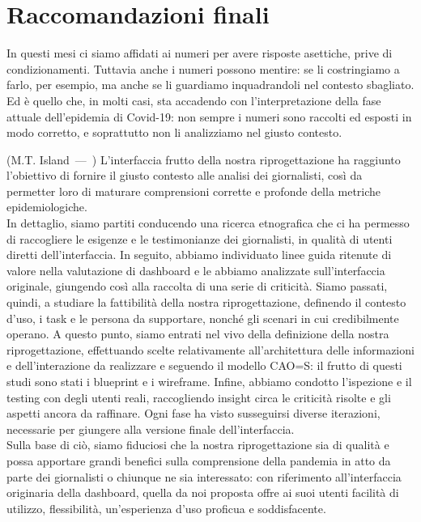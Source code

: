 \documentclass[../../main]{subfiles}
\begin{document}
\chapter{Raccomandazioni finali}
\label{c:raccomandazioni-finali}

\let\oldquote\quote
\let\endoldquote\endquote
\renewenvironment{quote}[2][]
{\if\relax\detokenize{#1}\relax
        \def\quoteauthor{#2}%
    \else
        \def\quoteauthor{#2~---~#1}%
    \fi
    \oldquote}
{\par\nobreak\smallskip\hfill(\quoteauthor)%
    \endoldquote\addvspace{\bigskipamount}}

\begin{quote}{M.T. Island}
    In questi mesi ci siamo affidati ai numeri per avere risposte asettiche, prive di condizionamenti.
    Tuttavia anche i numeri possono mentire: se li costringiamo a farlo, per esempio, ma anche se li guardiamo inquadrandoli nel contesto sbagliato.
    Ed è quello che, in molti casi, sta accadendo con l'interpretazione della fase attuale dell'epidemia di Covid-19: non sempre i numeri sono raccolti ed esposti in modo corretto, e soprattutto non li analizziamo nel giusto contesto.
\end{quote}
\noindent
L'interfaccia frutto della nostra riprogettazione ha raggiunto l'obiettivo di fornire il giusto contesto alle analisi dei giornalisti, così da permetter loro di maturare comprensioni corrette e profonde della metriche epidemiologiche.\\
In dettaglio, siamo partiti conducendo una ricerca etnografica che ci ha permesso di raccogliere le esigenze e le testimonianze dei giornalisti, in qualità di utenti diretti dell'interfaccia.
In seguito, abbiamo individuato linee guida ritenute di valore nella valutazione di dashboard e le abbiamo analizzate sull'interfaccia originale, giungendo così alla raccolta di una serie di criticità.
Siamo passati, quindi, a studiare la fattibilità della nostra riprogettazione, definendo il contesto d'uso, i task e le persona da supportare, nonché gli scenari in cui credibilmente operano.
A questo punto, siamo entrati nel vivo della definizione della nostra riprogettazione, effettuando scelte relativamente all'architettura delle informazioni e dell'interazione da realizzare e seguendo il modello CAO=S: il frutto di questi studi sono stati i blueprint e i wireframe.
Infine, abbiamo condotto l'ispezione e il testing con degli utenti reali, raccogliendo insight circa le criticità risolte e gli aspetti ancora da raffinare.
Ogni fase ha visto susseguirsi diverse iterazioni, necessarie per giungere alla versione finale dell'interfaccia.\\
Sulla base di ciò, siamo fiduciosi che la nostra riprogettazione sia di qualità e possa apportare grandi benefici sulla comprensione della pandemia in atto da parte dei giornalisti o chiunque ne sia interessato: con riferimento all'interfaccia originaria della dashboard, quella da noi proposta offre ai suoi utenti facilità di utilizzo, flessibilità, un'esperienza d'uso proficua e soddisfacente.
\end{document}
